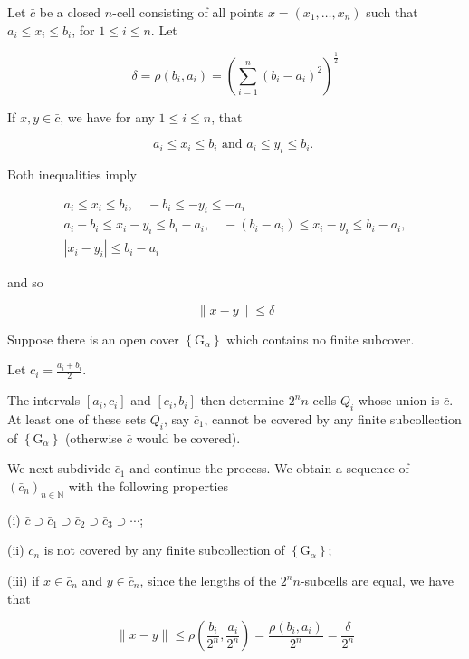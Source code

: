 \documentclass{article}
\begin{document}
Let $\bar{c}$ be a closed $n$-cell consisting of all points $x=\left(x_{1}, \ldots, x_{n}\right)$ such that $a_{i} \leq x_{i} \leq b_{i}$, for $1 \leq i \leq n$. Let

$$
\delta=\rho\left(b_{i}, a_{i}\right)=\left(\sum_{i=1}^{n}\left(b_{i}-a_{i}\right)^{2}\right)^{\frac{1}{2}}
$$

If $x, y \in \bar{c}$, we have for any $1 \leq i \leq n$, that

$$
a_{i} \leq x_{i} \leq b_{i} \text { and } a_{i} \leq y_{i} \leq b_{i} \text {. }
$$

Both inequalities imply

$$
\begin{gathered}
a_{i} \leq x_{i} \leq b_{i}, \quad-b_{i} \leq-y_{i} \leq-a_{i} \\
a_{i}-b_{i} \leq x_{i}-y_{i} \leq b_{i}-a_{i}, \quad-\left(b_{i}-a_{i}\right) \leq x_{i}-y_{i} \leq b_{i}-a_{i}, \\
\left|x_{i}-y_{i}\right| \leq b_{i}-a_{i}
\end{gathered}
$$

and so

$$
\|x-y\| \leq \delta
$$

Suppose there is an open cover $\left\{\mathrm{G}_{\alpha}\right\}$ which contains no finite subcover. 

Let $c_{i}=\frac{a_{i}+b_{i}}{2}$. 

The intervals $\left[a_{i}, c_{i}\right]$ and $\left[c_{i}, b_{i}\right]$ then determine $2^{n} n$-cells $Q_{i}$ whose union is $\bar{c}$. At least one of these sets $Q_{i}$, say $\bar{c}_{1}$, cannot be covered by any finite subcollection of $\left\{\mathrm{G}_{\alpha}\right\}$ (otherwise $\bar{c}$ would be covered). 

We next subdivide $\bar{c}_{1}$ and continue the process. We obtain a sequence of $\left(\bar{c}_{n}\right)_{n \in \mathbb{N}}$ with the following properties

(i) $\bar{c} \supset \bar{c}_{1} \supset \bar{c}_{2} \supset \bar{c}_{3} \supset \cdots$;

(ii) $\bar{c}_{n}$ is not covered by any finite subcollection of $\left\{\mathrm{G}_{\alpha}\right\}$;

(iii) if $x \in \bar{c}_{n}$ and $y \in \bar{c}_{n}$, since the lengths of the $2^{n} n$-subcells are equal, we have that

$$
\|x-y\| \leq \rho\left(\frac{b_{i}}{2^{n}}, \frac{a_{i}}{2^{n}}\right)=\frac{\rho\left(b_{i}, a_{i}\right)}{2^{n}}=\frac{\delta}{2^{n}}
$$
\end{document}
